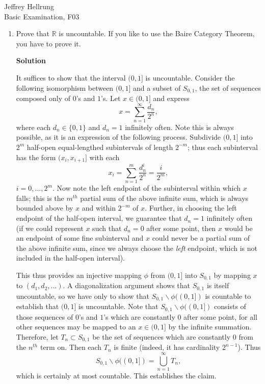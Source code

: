 \documentclass{article}
\begin{document}
\begin{flushright}
Jeffrey Hellrung \\
Basic Examination, F03 \\
\end{flushright}


\begin{enumerate}

\item Prove that \(\mathbb{R}\) is uncountable.  If you like to use the Baire Category Theorem, you have to prove it.

{\bf Solution}

It suffices to show that the interval \((0,1]\) is uncountable.  Consider the following isomorphism between \((0,1]\) and a subset of \(S_{0,1}\), the set of sequences composed only of \(0\)'s and \(1\)'s.  Let \(x \in (0,1]\) and express
\[x = \sum_{n = 1}^{\infty} \frac{d_n}{2^n},\]
where each \(d_n \in \{0,1\}\) and \(d_n = 1\) infinitely often.  Note this is always possible, as it is an expression of the following process.  Subdivide \((0,1]\) into \(2^m\) half-open equal-lengthed subintervals of length \(2^{-m}\); thus each subinterval has the form \((x_i, x_{i + 1}]\) with each
\[x_i = \sum_{n = 1}^m \frac{d_n^i}{2^n} = \frac{i}{2^m},\]
\(i = 0, \ldots, 2^m\).  Now note the left endpoint of the subinterval within which \(x\) falls; this is the \(m^{th}\) partial sum of the above infinite sum, which is always bounded above by \(x\) and within \(2^{-m}\) of \(x\).  Further, in choosing the left endpoint of the half-open interval, we guarantee that \(d_n = 1\) infinitely often (if we could represent \(x\) such that \(d_n = 0\) after some point, then \(x\) would be an endpoint of some fine subinterval and \(x\) could never be a partial sum of the above infinite sum, since we always choose the {\em left} endpoint, which is not included in the half-open interval).

This thus provides an injective mapping \(\phi\) from \((0,1]\) into \(S_{0,1}\) by mapping \(x\) to \((d_1, d_2, \ldots)\).  A diagonalization argument shows that \(S_{0,1}\) is itself uncountable, so we have only to show that \(S_{0,1} \backslash \phi((0,1])\) is countable to establish that \((0,1]\) is uncountable.  Note that \(S_{0,1} \backslash \phi((0,1])\) consists of those sequences of \(0\)'s and \(1\)'s which are constantly \(0\) after some point, for all other sequences may be mapped to an \(x \in (0,1]\) by the infinite summation.  Therefore, let \(T_n \subset S_{0,1}\) be the set of sequences which are constantly \(0\) from the \(n^{th}\) term on.  Then each \(T_n\) is finite (indeed, it has cardinality \(2^{n - 1}\)).  Thus
\[S_{0,1} \backslash \phi((0,1]) = \bigcup_{n = 1}^{\infty} T_n,\]
which is certainly at most countable.  This establishes the claim.




\end{enumerate}
\end{document}
